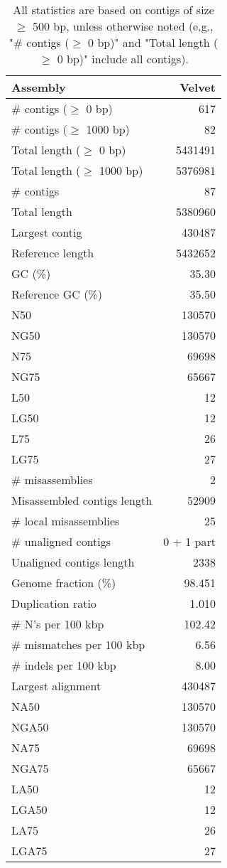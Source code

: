 \documentclass[12pt,a4paper]{article}
\begin{document}
\begin{table}[ht]
\begin{center}
\caption{All statistics are based on contigs of size $\geq$ 500 bp, unless otherwise noted (e.g., "\# contigs ($\geq$ 0 bp)" and "Total length ($\geq$ 0 bp)" include all contigs).}
\begin{tabular}{|l*{1}{|r}|}
\hline
Assembly & Velvet \\ \hline
\# contigs ($\geq$ 0 bp) & 617 \\ \hline
\# contigs ($\geq$ 1000 bp) & 82 \\ \hline
Total length ($\geq$ 0 bp) & 5431491 \\ \hline
Total length ($\geq$ 1000 bp) & 5376981 \\ \hline
\# contigs & 87 \\ \hline
Total length & 5380960 \\ \hline
Largest contig & 430487 \\ \hline
Reference length & 5432652 \\ \hline
GC (\%) & 35.30 \\ \hline
Reference GC (\%) & 35.50 \\ \hline
N50 & 130570 \\ \hline
NG50 & 130570 \\ \hline
N75 & 69698 \\ \hline
NG75 & 65667 \\ \hline
L50 & 12 \\ \hline
LG50 & 12 \\ \hline
L75 & 26 \\ \hline
LG75 & 27 \\ \hline
\# misassemblies & 2 \\ \hline
Misassembled contigs length & 52909 \\ \hline
\# local misassemblies & 25 \\ \hline
\# unaligned contigs & 0 + 1 part \\ \hline
Unaligned contigs length & 2338 \\ \hline
Genome fraction (\%) & 98.451 \\ \hline
Duplication ratio & 1.010 \\ \hline
\# N's per 100 kbp & 102.42 \\ \hline
\# mismatches per 100 kbp & 6.56 \\ \hline
\# indels per 100 kbp & 8.00 \\ \hline
Largest alignment & 430487 \\ \hline
NA50 & 130570 \\ \hline
NGA50 & 130570 \\ \hline
NA75 & 69698 \\ \hline
NGA75 & 65667 \\ \hline
LA50 & 12 \\ \hline
LGA50 & 12 \\ \hline
LA75 & 26 \\ \hline
LGA75 & 27 \\ \hline
\end{tabular}
\end{center}
\end{table}
\end{document}
